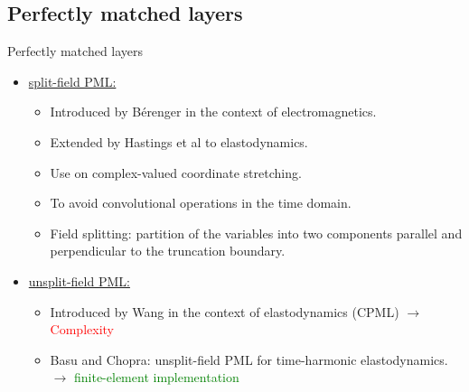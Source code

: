\subsection{Perfectly matched layers}
\begin{frame}{Perfectly matched layers}
\pause
    \begin{itemize}
        \item \underline{split-field PML:} 
        \begin{itemize}
        \pause
            \item Introduced by Bérenger in the context of electromagnetics.
            \item Extended by Hastings et al to elastodynamics.
            \item Use on complex-valued coordinate stretching.
            \item To avoid convolutional operations in the time domain.
            \item Field splitting: partition of the variables into two components parallel and perpendicular to the truncation boundary.
        \end{itemize}
    \item \underline{unsplit-field PML:} 
        \begin{itemize}
        \pause
            \item Introduced by Wang in the context of elastodynamics (CPML) $\rightarrow$ \textcolor{red}{Complexity} 
            \pause
            \item Basu and Chopra: unsplit-field PML for time-harmonic elastodynamics. $\rightarrow$ \textcolor{green}{finite-element implementation}
        \end{itemize}
    \end{itemize}
\end{frame}

